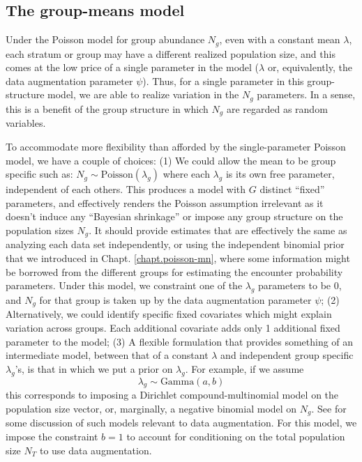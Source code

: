 \subsection{The group-means model}

Under the Poisson model for group abundance $N_g$, even with a
constant mean $\lambda$, each stratum or group may have a different
realized population size, and this comes at the low price of a single
parameter in the model ($\lambda$ or, equivalently, the data
augmentation parameter $\psi$).  Thus, for a single parameter in this
group-structure model, we are able to realize variation in the $N_{g}$
parameters. In a sense, this is a benefit of the group structure in
which $N_{g}$ are regarded as random variables.

To accommodate more flexibility than afforded by the single-parameter
Poisson model, we have a couple of choices: (1) We could allow the
mean to be group specific such as: $N_g \sim
\mbox{Poisson}(\lambda_{g})$ where each $\lambda_{g}$ is its own free
parameter, independent of each others. This produces a model with $G$
distinct ``fixed'' parameters, and effectively renders the Poisson
assumption irrelevant as it doesn't induce any ``Bayesian shrinkage''
\citep{sauer_link:2002} or impose any group structure on the
population sizes $N_{g}$. It should provide estimates that are
effectively the same as analyzing each data set independently, or
using the independent binomial prior that we introduced in
Chapt. \ref{chapt.poisson-mn}, where some information might be
borrowed from the different groups for estimating the encounter
probability parameters.  Under this model, we constraint one of the
$\lambda_{g}$ parameters to be 0, and $N_{g}$ for that group is taken
up by the data augmentation parameter $\psi$; (2) Alternatively, we
could identify specific fixed covariates which might explain variation
across groups. Each additional covariate adds only 1 additional fixed
parameter to the model; (3) A flexible formulation that provides
something of an intermediate model, between that of a constant
$\lambda$ and independent group specific $\lambda_{g}$'s, is that in
which we put a prior on $\lambda_{g}$. For example, if we assume
\[
 \lambda_{g} \sim \mbox{Gamma}(a,b)
\]
this corresponds to imposing a Dirichlet compound-multinomial
model on the population size vector, or, marginally, a negative
binomial model on $N_{g}$. See \citet{takemura:1999} for some
discussion of such models relevant to data augmentation.  For this
model, we impose the constraint $b=1$ to account for conditioning on
the total population size $N_{T}$ to use data augmentation.


